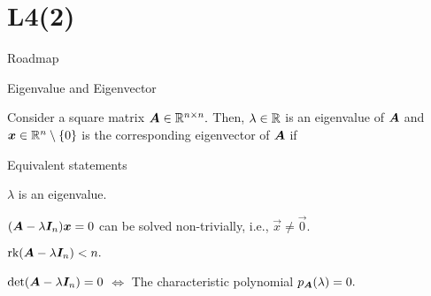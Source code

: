 \documentclass[handout,fleqn,aspectratio=169]{beamer}
\begin{document}
\section{L4(2)}
\begin{frame}{Roadmap}

\plitemsep 0.1in

\bce[(1)] 
\item {}

\item {}

\item {}

\ece
\end{frame}

\begin{frame}{Eigenvalue and Eigenvector}

\plitemsep 0.1in

\bci
\item {} Consider a square matrix $\bm{A} \in {\mathbb R}^{n \times n}.$ Then, $\lambda \in {\mathbb R}$ is an eigenvalue of $\bm{A}$ and $\bm{x} \in {\mathbb R}^n \setminus \{0 \}$ is the corresponding eigenvector of $\bm{A}$ if 
\item Equivalent statements
\bci
\item $\lambda$ is an eigenvalue.
\item $(\bm{A} - \lambda \bm{I}_n)\bm{x}=0$ can be solved non-trivially, i.e., $\vec{x} \neq \vec{0}.$
\item $\text{rk}(\bm{A} - \lambda\bm{I}_n) < n.$
\item $\det(\bm{A} - \lambda\bm{I}_n) =0$ $\Longleftrightarrow$ The characteristic polynomial $p_{\bm{A}}(\lambda)=0.$
\eci
\eci
\end{frame}
\end{document}
